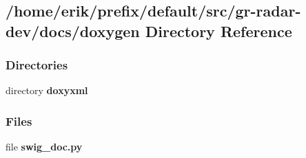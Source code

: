 \subsection{/home/erik/prefix/default/src/gr-\/radar-\/dev/docs/doxygen Directory Reference}
\label{dir_fb61fa2b9253853de0ae34cbc84ed107}
\subsubsection*{Directories}
\begin{DoxyCompactItemize}
\item 
directory {\bf doxyxml}
\end{DoxyCompactItemize}
\subsubsection*{Files}
\begin{DoxyCompactItemize}
\item 
file {\bf swig\+\_\+doc.\+py}
\end{DoxyCompactItemize}
